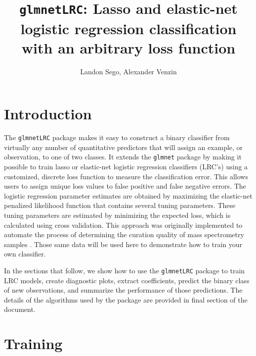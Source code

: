 \documentclass{article}
\begin{document}
 


\title{{\tt glmnetLRC}: Lasso and elastic-net logistic regression classification with an arbitrary loss function\\}
\author{Landon Sego, Alexander Venzin}
\maketitle

\section{Introduction}

The {\tt glmnetLRC} package makes it easy to construct a binary classifier from virtually any number of quantitative predictors 
that will assign an example, or observation, to one of two classes.
It extends the {\tt glmnet} package by making it possible to train lasso or elastic-net logistic 
regression classifiers (LRC's) using a customized, discrete loss function to measure the classification error.  
This allows users to assign unique 
loss values to false positive and false negative errors. The logistic regression parameter
estimates are obtained by maximizing the elastic-net penalized likelihood function that contains several tuning parameters. These
tuning parameters are estimated by minimizing the expected loss, which is calculated using cross validation.
This approach was originally implemented to automate the
process of determining the curation quality of mass spectrometry samples \cite{Amidan}. Those same data
will be used here to demonstrate how to train your own classifier.

In the sections that follow, we show how to use the {\tt glmnetLRC} package to train LRC models, create diagnostic plots,
extract coefficients, predict the binary class of new observations, and summarize the performance of those
predictions. The details of the algorithms used by the package are provided in final section of the document.

\section{Training}
\end{document}
